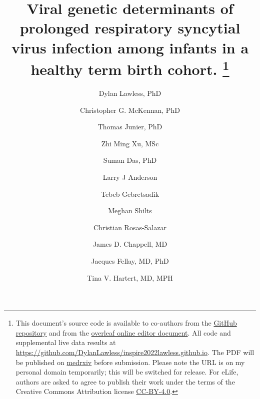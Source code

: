 \documentclass{article} %
\begin{document}
\date{} %
\title{\Large \bf Viral genetic determinants of prolonged respiratory syncytial virus infection among infants in a healthy term birth cohort.
\footnote{This document's source code is available to co-authors from the 
\href{https://github.com/DylanLawless/inspire2022lawless.github.io}{GitHub repository} 
and from the 
\href{https://www.overleaf.com/project/61718a4e077acc3d20ee68f1}{overleaf online editor document}. 
All code and supplemental live data results at \href{https://github.com/DylanLawless/inspire2022lawless.github.io}{https://github.com/DylanLawless/inspire2022lawless.github.io}. 
The PDF will be published on  \href{https://www.medrxiv.org}{medrxiv} 
before submission.
Please note the URL is on my personal domain temporarily; this will be switched for release.
For eLife, authors are asked to agree to publish their work under the terms of the Creative Commons Attribution license
\href{https://creativecommons.org/licenses/by/4.0/}{CC-BY-4.0}.
}
}


\author[1]{\rm Dylan Lawless, PhD}
\author[2]{\rm Christopher G. McKennan, PhD}
\author[3]{\rm Thomas Junier, PhD}
\author[1]{\rm Zhi Ming Xu, MSc}
\author[4]{\rm Suman Das, PhD}
\author[5]{\rm Larry J Anderson}
\author[6]{\rm  Tebeb Gebretsadik}
\author[7]{\rm Meghan Shilts}
\author[8]{\rm Christian Rosas-Salazar}
\author[9]{\rm James D. Chappell, MD}
\author[1]{\rm Jacques Fellay, MD, PhD }
\author[7,9]{\rm Tina V. Hartert, MD, MPH}

\end{document}
